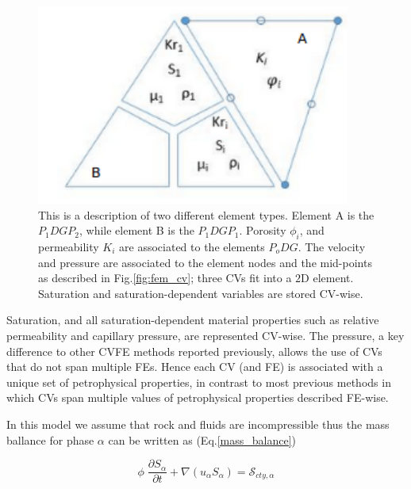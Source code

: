 \documentclass[preprint,authoryear,12pt]{elsarticle}
\begin{document}

\begin{figure}[h]
\centering
\vbox{\includegraphics[width=.5\textwidth]{./Pics/element_n.pdf}}
\caption{This is a description of two different element types. Element A is the $P_{1}DGP_{2}$, while element B is the $P_{1}DGP_{1}$. Porosity $\phi_{i}$, and permeability $K_{i}$ are associated to the elements $P_{o}DG$. The velocity and pressure are associated to the element nodes and the mid-points as described in Fig.\ref{fig:fem_cv}; three CVs fit into a $2$D element. Saturation and saturation-dependent variables are stored CV-wise. }
\label{fig:fem_elem}
\end{figure}

Saturation, and all saturation-dependent material properties such as relative permeability and capillary pressure, are represented CV-wise. The pressure, a key difference to other CVFE methods reported previously, allows the use of CVs that do not span multiple FEs. Hence each CV (and FE) is associated with a unique set of petrophysical properties, in contrast to most previous methods in which CVs span multiple values of petrophysical properties described FE-wise.

In this model we assume that rock and fluids are incompressible thus the mass ballance for phase $\alpha$ can be written as (Eq.\ref{mass_balance})

\begin{equation}
\phi \; \frac{\partial S_{\alpha}}{\partial t} + \nabla (u_{\alpha}S_{\alpha})= \mathcal{S}_{cty,\alpha}
\label{mass_balance}
\end{equation}
 
\end{document}
